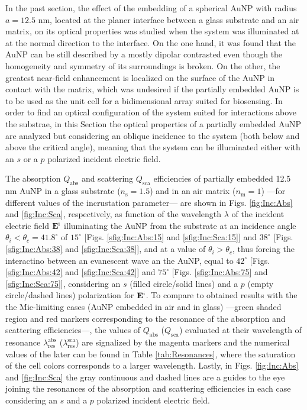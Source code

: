 
In the past section, the effect of the embedding of a spherical AuNP with radius $a = 12.5$ nm, located at the planer interface between a glass substrate and an air matrix,  on its optical properties was studied when the system was illuminated at at the normal direction to the interface. On the one hand, it was found that the AuNP can be still described by a mostly dipolar contrasted even though the homogeneity and symmetry of its surroundings is broken. On the other, the greatest near-field enhancement is localized on the surface of the AuNP in contact with the matrix, which was undesired if the partially embedded AuNP is to be used as the unit cell for a bidimensional array suited for biosensing. In order to find an optical configuration of the system suited for interactions above the substrae, in this Section the optical properties of a partially embedded AuNP are analyzed but considering an oblique incidence to the system (both below and above the critical angle), meaning that the system can be illuminated either with an $s$ or a $p$ polarized incident electric field.

The absorption $Q_\text{abs}$ and scattering $Q_\text{sca}$ efficiencies of partially embedded 12.5 nm AuNP in a glass substrate ($n_\text{s} = 1.5$) and in an air matrix ($n_\text{m} = 1$) ---for different values of the incrustation parameter--- are shown in Figs. \ref{fig:Inc:Abs} and \ref{fig:Inc:Sca}, respectively, as function of the wavelength $\lambda$ of the incident electric field $\vb{E}^\text{i}$ illuminating the AuNP from the substrate at an incidence angle $\theta_i < \theta_c = 41.8^\circ$ of $15^\circ$ [Figs. \ref{sfig:Inc:Abs:15} and \ref{sfig:Inc:Sca:15}] and  $38^\circ$ [Figs. \ref{sfig:Inc:Abs:38} and \ref{sfig:Inc:Sca:38}], and  at a value of $\theta_i>\theta_c$, thus forcing the interactino between an evanescent wave an the AuNP, equal to $42^\circ$  [Figs. \ref{sfig:Inc:Abs:42} and \ref{sfig:Inc:Sca:42}] and $75^\circ$  [Figs. \ref{sfig:Inc:Abs:75} and \ref{sfig:Inc:Sca:75}], considering an $s$ (filled circle/solid lines) and a $p$ (empty circle/dashed lines) polarization for $\vb{E}^\text{i}$. To compare to obtained results with the the Mie-limiting cases (AuNP embedded in air and in glass) ---green shaded region and red markers corresponding to the resonance of the absorption and scattering efficiencies---, the values of $Q_\text{abs}$ ($Q_\text{sca}$) evaluated at their wavelength of resonance $\lambda_\text{res}^\text{abs}$ ($\lambda_\text{res}^\text{sca}$) are signalized by the magenta markers and the numerical values of the later can be found in Table \ref{tab:Resonances}, where the saturation of the cell colors corresponds to a larger wavelength. Lastly, in Figs. \ref{fig:Inc:Abs} and \ref{fig:Inc:Sca} the gray continuous and dashed lines are a guides to the eye joining the resonances of the absorption and scattering efficiencies in each case considering an $s$ and a $p$ polarized incident electric field.

